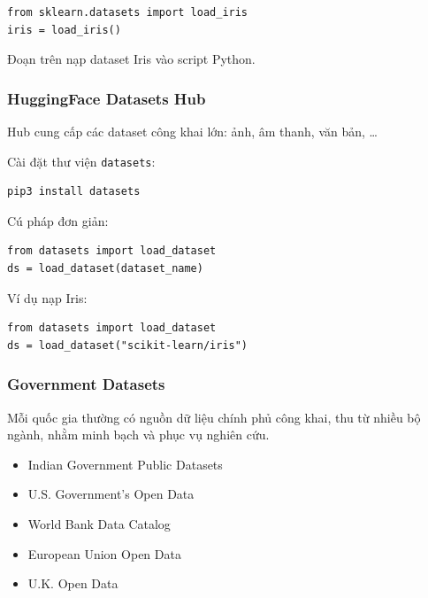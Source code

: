 \begin{vidu}[title={Nạp dataset Iris từ scikit-learn}]
\begin{lstlisting}
from sklearn.datasets import load_iris
iris = load_iris()
\end{lstlisting}
Đoạn trên nạp dataset Iris vào script Python.
\end{vidu}

\subsubsection{HuggingFace Datasets Hub}

\begin{ynghia}[title={HuggingFace Datasets Hub}]
Hub cung cấp các dataset công khai lớn: ảnh, âm thanh, văn bản, \ldots
\end{ynghia}

\begin{vidu}[title={Cài đặt và nạp dataset với HuggingFace}]
Cài đặt thư viện \texttt{datasets}:
\begin{lstlisting}
pip3 install datasets
\end{lstlisting}
Cú pháp đơn giản:
\begin{lstlisting}
from datasets import load_dataset
ds = load_dataset(dataset_name)
\end{lstlisting}
Ví dụ nạp Iris:
\begin{lstlisting}
from datasets import load_dataset
ds = load_dataset("scikit-learn/iris")
\end{lstlisting}
\end{vidu}

\subsubsection{Government Datasets}

\begin{ynghia}[title={Government Datasets}]
Mỗi quốc gia thường có nguồn dữ liệu chính phủ công khai, thu từ nhiều bộ ngành, nhằm minh bạch và phục vụ nghiên cứu.
\end{ynghia}

\begin{phuongphap}[title={Một số liên kết dataset chính phủ}]
\begin{itemize}
  \item Indian Government Public Datasets
  \item U.S. Government's Open Data
  \item World Bank Data Catalog
  \item European Union Open Data
  \item U.K. Open Data
\end{itemize}
\end{phuongphap}

